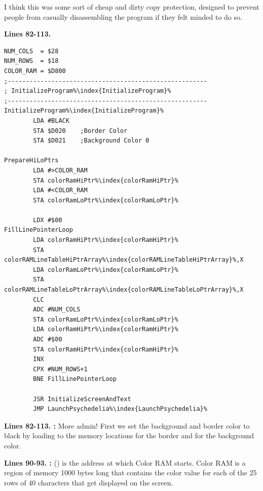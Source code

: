 I think this was some sort of cheap and dirty copy protection, designed to prevent people from casually disassembling the
program if they felt minded to do so. 

\clearpage
\textbf{Lines 82-113. }
\begin{lstlisting}[caption=The initialization routine - visited only once\, at the very start of execution,escapechar=\%]
NUM_COLS  = $28
NUM_ROWS  = $18
COLOR_RAM = $D800
;-------------------------------------------------------
; InitializeProgram%\index{InitializeProgram}%
;-------------------------------------------------------
InitializeProgram%\index{InitializeProgram}%   
        LDA #BLACK
        STA $D020    ;Border Color
        STA $D021    ;Background Color 0

PrepareHiLoPtrs
        LDA #>COLOR_RAM
        STA colorRamHiPtr%\index{colorRamHiPtr}%
        LDA #<COLOR_RAM
        STA colorRamLoPtr%\index{colorRamLoPtr}%

        LDX #$00
FillLinePointerLoop
        LDA colorRamHiPtr%\index{colorRamHiPtr}%
        STA colorRAMLineTableHiPtrArray%\index{colorRAMLineTableHiPtrArray}%,X
        LDA colorRamLoPtr%\index{colorRamLoPtr}%
        STA colorRAMLineTableLoPtrArray%\index{colorRAMLineTableLoPtrArray}%,X
        CLC 
        ADC #NUM_COLS
        STA colorRamLoPtr%\index{colorRamLoPtr}%
        LDA colorRamHiPtr%\index{colorRamHiPtr}%
        ADC #$00
        STA colorRamHiPtr%\index{colorRamHiPtr}%
        INX 
        CPX #NUM_ROWS+1
        BNE FillLinePointerLoop

        JSR InitializeScreenAndText
        JMP LaunchPsychedelia%\index{LaunchPsychedelia}%

\end{lstlisting}
\clearpage

\textbf{Lines 82-113. :} More admin!  First we set the background and border color to black by loading
 to the memory locations  for the border and  for the background color.

\bigskip
\bigskip
\textbf{Lines 90-93. :}  () is the address at which Color RAM starts. Color
RAM is a region of memory 1000 bytes long that contains the color value for each of the 25 rows of 40 characters that get displayed on the
screen. 

